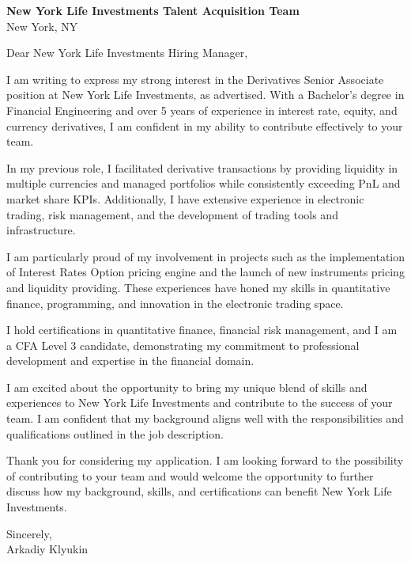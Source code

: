 \documentclass{letter}
\begin{document}
\begin{letter}{\textbf{New York Life Investments Talent Acquisition Team} \\
                New York, NY}


\opening{Dear New York Life Investments Hiring Manager,}

I am writing to express my strong interest in the Derivatives Senior Associate position at New York Life Investments, as advertised. With a Bachelor's degree in Financial Engineering and over 5 years of experience in interest rate, equity, and currency derivatives, I am confident in my ability to contribute effectively to your team.

In my previous role, I facilitated derivative transactions by providing liquidity in multiple currencies and managed portfolios while consistently exceeding PnL and market share KPIs. Additionally, I have extensive experience in electronic trading, risk management, and the development of trading tools and infrastructure.

I am particularly proud of my involvement in projects such as the implementation of Interest Rates Option pricing engine and the launch of new instruments pricing and liquidity providing. These experiences have honed my skills in quantitative finance, programming, and innovation in the electronic trading space.

I hold certifications in quantitative finance, financial risk management, and I am a CFA Level 3 candidate, demonstrating my commitment to professional development and expertise in the financial domain.

I am excited about the opportunity to bring my unique blend of skills and experiences to New York Life Investments and contribute to the success of your team. I am confident that my background aligns well with the responsibilities and qualifications outlined in the job description.

Thank you for considering my application. I am looking forward to the possibility of contributing to your team and would welcome the opportunity to further discuss how my background, skills, and certifications can benefit New York Life Investments.

Sincerely,\\
Arkadiy Klyukin
\end{letter}
\end{document}
